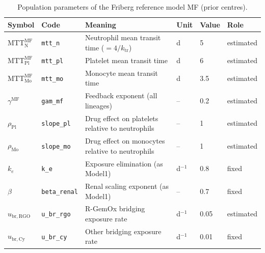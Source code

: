 \begin{table}[!htbp]
\centering
\footnotesize
\setlength{\tabcolsep}{3.5pt}
\caption{Population parameters of the Friberg reference model MF (prior centres).}
\label{tab:mf}
\begin{tabular}{ll>{\raggedright\arraybackslash}p{6cm}lll}
\toprule
Symbol & Code & Meaning & Unit & Value & Role \\
\midrule
$\mathrm{MTT}^{\mathrm{MF}}_{\mathrm{N}}$ & \texttt{mtt\_n} & Neutrophil mean transit time ($=4/k_{\mathrm{tr}}$) & d & 5 & estimated \\
$\mathrm{MTT}^{\mathrm{MF}}_{\mathrm{Pl}}$ & \texttt{mtt\_pl} & Platelet mean transit time & d & 6 & estimated \\
$\mathrm{MTT}^{\mathrm{MF}}_{\mathrm{Mo}}$ & \texttt{mtt\_mo} & Monocyte mean transit time & d & 3.5 & estimated \\
$\gamma^{\mathrm{MF}}$ & \texttt{gam\_mf} & Feedback exponent (all lineages) & -- & 0.2 & estimated \\
$\rho_{\mathrm{Pl}}$ & \texttt{slope\_pl} & Drug effect on platelets relative to neutrophils & -- & 1 & estimated \\
$\rho_{\mathrm{Mo}}$ & \texttt{slope\_mo} & Drug effect on monocytes relative to neutrophils & -- & 1 & estimated \\
$k_e$ & \texttt{k\_e} & Exposure elimination (as Model1) & d$^{-1}$ & 0.8 & fixed \\
$\beta$ & \texttt{beta\_renal} & Renal scaling exponent (as Model1) & -- & 0.7 & fixed \\
$u_{\mathrm{br,RGO}}$ & \texttt{u\_br\_rgo} & R-GemOx bridging exposure rate & d$^{-1}$ & 0.05 & estimated \\
$u_{\mathrm{br,Cy}}$ & \texttt{u\_br\_cy} & Other bridging exposure rate & d$^{-1}$ & 0.01 & fixed \\
\bottomrule
\end{tabular}
\end{table}

